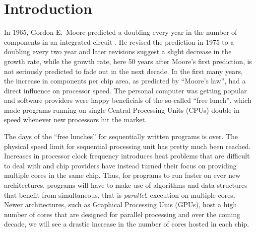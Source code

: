 \documentclass[oneside,11pt]{book}
\begin{document}
\chapter{Introduction}
In 1965, Gordon E.\ Moore predicted a doubling every year in the
number of components in an integrated circuit \cite{moore1965}. He
revised the prediction in 1975 to a doubling every two year
\cite{moore1975} and later revisions suggest a slight decrease in the
growth rate, while the growth rate, here 50 years after Moore's first
prediction, is not seriously predicted to fade out in the next
decade. In the first many years, the increase in components per chip
area, as predicted by ``Moore's law'', had a direct influence on
processor speed. The personal computer was getting popular and
software providers were happy beneficials of the so-called ``free
lunch'', which made programs running on single Central Processing
Units (CPUs) double in speed whenever new processors hit the market.

The days of the ``free lunches'' for sequentially written programs is
over. The physical speed limit for sequential processing unit has
pretty much been reached. Increases in processor clock frequency
introduces heat problems that are difficult to deal with and chip
providers have instead turned their focus on providing multiple cores in the
same chip. Thus, for programs to run faster on ever new
architectures, programs will have to make use of algorithms and data
structures that benefit from simultaneous, that is \emph{parallel},
execution on multiple cores. Newer architectures, such as Graphical
Processing Unis (GPUs), host a high number of cores that are designed
for parallel processing and over the coming decade, we will see a
drastic increase in the number of cores hosted in each chip.
\end{document}
